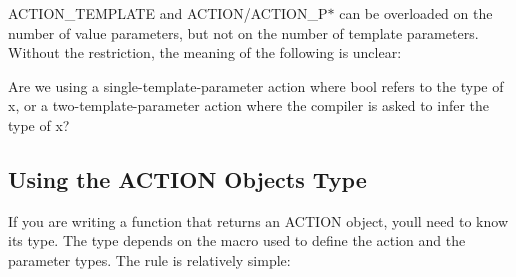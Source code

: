 {\ttfamily A\+C\+T\+I\+O\+N\+\_\+\+T\+E\+M\+P\+L\+A\+TE} and {\ttfamily A\+C\+T\+I\+ON}/{\ttfamily A\+C\+T\+I\+O\+N\+\_\+\+P$\ast$} can be overloaded on the number of value parameters, but not on the number of template parameters. Without the restriction, the meaning of the following is unclear\+:


\begin{DoxyCode}{0}
\end{DoxyCode}


Are we using a single-\/template-\/parameter action where {\ttfamily bool} refers to the type of {\ttfamily x}, or a two-\/template-\/parameter action where the compiler is asked to infer the type of {\ttfamily x}?

\subsection*{Using the A\+C\+T\+I\+ON Object\textquotesingle{}s Type}

If you are writing a function that returns an {\ttfamily A\+C\+T\+I\+ON} object, you\textquotesingle{}ll need to know its type. The type depends on the macro used to define the action and the parameter types. The rule is relatively simple\+:

